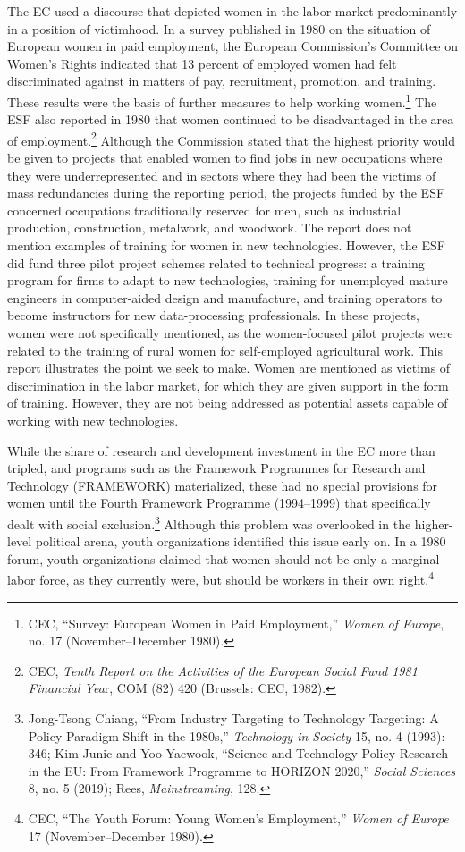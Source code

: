 \documentclass{tufte-handout}
\begin{document}
The EC used a discourse that depicted women in the labor market
predominantly in a position of victimhood. In a survey published in 1980
on the situation of European women in paid employment, the European
Commission's Committee on Women's Rights indicated that 13 percent of
employed women had felt discriminated against in matters of pay,
recruitment, promotion, and training. These results were the basis of
further measures to help working women.\footnote{CEC, ``Survey: European
  Women in Paid Employment,'' \emph{Women of Europe}, no. 17
  (November--December 1980).} The ESF also reported in 1980 that women
continued to be disadvantaged in the area of employment.\footnote{CEC,
  \emph{Tenth Report on the Activities of the European Social Fund 1981
  Financial Yea}r, COM (82) 420 (Brussels: CEC, 1982).} Although the
Commission stated that the highest priority would be given to projects
that enabled women to find jobs in new occupations where they were
underrepresented and in sectors where they had been the victims of mass
redundancies during the reporting period, the projects funded by the ESF
concerned occupations traditionally reserved for men, such as industrial
production, construction, metalwork, and woodwork. The report does not
mention examples of training for women in new technologies. However, the
ESF did fund three pilot project schemes related to technical progress:
a training program for firms to adapt to new technologies, training for
unemployed mature engineers in computer-aided design and manufacture,
and training operators to become instructors for new data-processing
professionals. In these projects, women were not specifically mentioned,
as the women-focused pilot projects were related to the training of
rural women for self-employed agricultural work. This report illustrates
the point we seek to make. Women are mentioned as victims of
discrimination in the labor market, for which they are given support in
the form of training. However, they are not being addressed as potential
assets capable of working with new technologies.

While the share of research and development investment in the EC more
than tripled, and programs such as the Framework Programmes for Research
and Technology (FRAMEWORK) materialized, these had no special provisions
for women until the Fourth Framework Programme (1994--1999) that
specifically dealt with social exclusion.\footnote{Jong-Tsong Chiang,
  ``From Industry Targeting to Technology Targeting: A Policy Paradigm
  Shift in the 1980s,'' \emph{Technology in Society} 15, no. 4 (1993):
  346; Kim Junic and Yoo Yaewook, ``Science and Technology Policy
  Research in the EU: From Framework Programme to HORIZON 2020,''
  \emph{Social Sciences} 8, no. 5 (2019); Rees, \emph{Mainstreaming},
  128.} Although this problem was overlooked in the higher-level
political arena, youth organizations identified this issue early on. In
a 1980 forum, youth organizations claimed that women should not be only
a marginal labor force, as they currently were, but should be workers in
their own right.\footnote{CEC, ``The Youth Forum: Young Women's
  Employment,'' \emph{Women of Europe} 17 (November--December 1980).}
\end{document}
